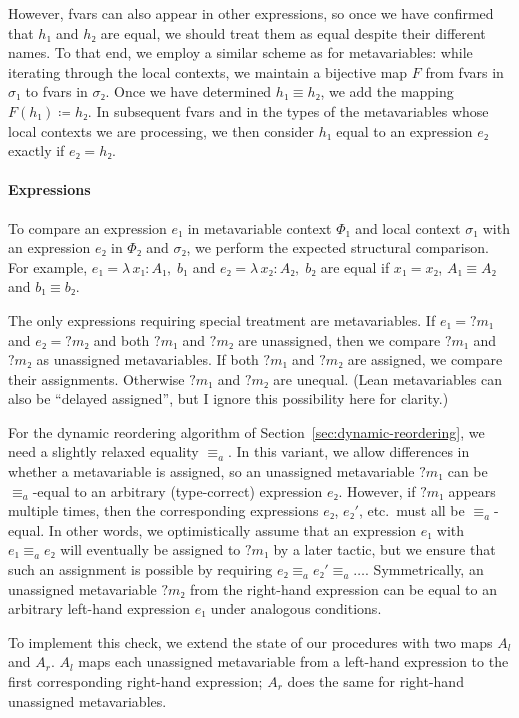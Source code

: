 \documentclass[sigplan,10pt,anonymous,review]{acmart}
\newcommand{\Lam}[2]{λ\,#1,\; #2}
\newcommand{\mvar}[1]{{?#1}}
\begin{document}
However, fvars can also appear in other expressions, so once we have confirmed that $h₁$ and $h₂$ are equal, we should treat them as equal despite their different names.
To that end, we employ a similar scheme as for metavariables: while iterating through the local contexts, we maintain a bijective map $F$ from fvars in $σ₁$ to fvars in $σ₂$.
Once we have determined $h₁ ≡ h₂$, we add the mapping $F(h₁) ≔ h₂$.
In subsequent fvars and in the types of the metavariables whose local contexts we are processing, we then consider $h₁$ equal to an expression $e₂$ exactly if $e₂ = h₂$.

\paragraph{Expressions} To compare an expression $e₁$ in metavariable context $Φ₁$ and local context $σ₁$ with an expression $e₂$ in $Φ₂$ and $σ₂$, we perform the expected structural comparison.
For example, $e₁ = \Lam{x₁ : A₁}{b₁}$ and $e₂ = \Lam{x₂ : A₂}{b₂}$ are equal if $x₁ = x₂$, $A₁ ≡ A₂$ and $b₁ ≡ b₂$.

The only expressions requiring special treatment are metavariables.
If $e₁ = \mvar{m₁}$ and $e₂ = \mvar{m₂}$ and both $\mvar{m₁}$ and $\mvar{m₂}$ are unassigned, then we compare $\mvar{m₁}$ and $\mvar{m₂}$ as unassigned metavariables.
If both $\mvar{m₁}$ and $\mvar{m₂}$ are assigned, we compare their assignments.
Otherwise $\mvar{m₁}$ and $\mvar{m₂}$ are unequal.
(Lean metavariables can also be \enquote{delayed assigned}, but I ignore this possibility here for clarity.)

\medskip

For the dynamic reordering algorithm of Section~\ref{sec:dynamic-reordering}, we need a slightly relaxed equality $≡_{a}$.
In this variant, we allow differences in whether a metavariable is assigned, so an unassigned metavariable $\mvar{m₁}$ can be $≡_{a}$-equal to an arbitrary (type-correct) expression $e₂$.
However, if $\mvar{m₁}$ appears multiple times, then the corresponding expressions $e₂$, $e₂'$, etc.\ must all be $≡_{a}$-equal.
In other words, we optimistically assume that an expression $e₁$ with $e₁ ≡_{a} e₂$ will eventually be assigned to $\mvar{m₁}$ by a later tactic, but we ensure that such an assignment is possible by requiring $e₂ ≡_{a} e₂' ≡_{a} \dots$.
Symmetrically, an unassigned metavariable $\mvar{m₂}$ from the right-hand expression can be equal to an arbitrary left-hand expression $e₁$ under analogous conditions.

To implement this check, we extend the state of our procedures with two maps $A_{l}$ and $A_{r}$.
$A_{l}$ maps each unassigned metavariable from a left-hand expression to the first corresponding right-hand expression; $A_{r}$ does the same for right-hand unassigned metavariables.
\end{document}
